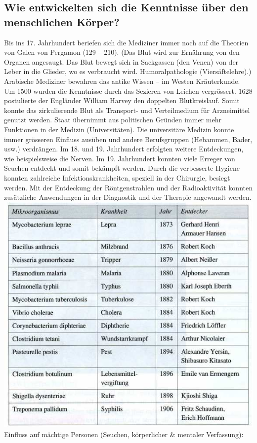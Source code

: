 \documentclass[10pt, openright=true]{scrartcl}
\begin{document}
\subsection{Wie entwickelten sich die Kenntnisse über den menschlichen Körper?}
Bis ins 17. Jahrhundert beriefen sich die Mediziner immer noch auf die Theorien von Galen von Pergamon (129 – 210). (Das Blut wird zur Ernährung von den Organen angesaugt. Das Blut bewegt sich in Sackgassen (den Venen) von der Leber in die Glieder, wo es verbraucht wird. Humoralpathologie (Viersäftelehre).)  Arabische Mediziner bewahren das antike Wissen – im Westen Kräuterkunde. Um 1500 wurden die Kenntnisse durch das Sezieren von Leichen vergrössert. 1628 postulierte der Engländer William Harvey den doppelten Blutkreislauf. Somit konnte das zirkulierende Blut als Transport- und Verteilmedium für Arzneimittel genutzt werden. Staat übernimmt aus politischen Gründen immer mehr Funktionen in der Medizin (Universitäten). Die universitäre Medizin konnte immer grösseren Einfluss ausüben und andere Berufsgruppen (Hebammen, Bader, usw.) verdrängen. Im 18. und 19. Jahrhundert erfolgten weitere Entdeckungen, wie beispielsweise die Nerven. Im 19. Jahrhundert konnten viele Erreger von Seuchen entdeckt und somit bekämpft werden. Durch die verbesserte Hygiene konnten zahlreiche Infektionskrankheiten, speziell in der Chirurgie, besiegt werden. Mit der Entdeckung der Röntgenstrahlen und der Radioaktivität konnten zusätzliche Anwendungen in der Diagnostik und der Therapie angewandt werden.\\
\includegraphics[width=.5\textwidth]{images/krankheit}\\
Einfluss auf mächtige Personen (Seuchen, körperlicher \& mentaler Verfassung):\\
\end{document}
